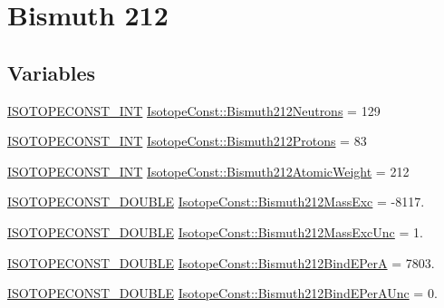 \hypertarget{group___isotope_const-_bismuth-_bi212}{}\section{Bismuth 212}
\label{group___isotope_const-_bismuth-_bi212}
\subsection*{Variables}
\begin{DoxyCompactItemize}
\item 
\mbox{\hyperlink{group___isotope_const-_macros_ga5f18360b3e99483a35c32d789e62621c}{I\+S\+O\+T\+O\+P\+E\+C\+O\+N\+S\+T\+\_\+\+I\+NT}} \mbox{\hyperlink{group___isotope_const-_bismuth-_bi212_gafde890acc72feb17eb33e141959ed41d}{Isotope\+Const\+::\+Bismuth212\+Neutrons}} = 129
\item 
\mbox{\hyperlink{group___isotope_const-_macros_ga5f18360b3e99483a35c32d789e62621c}{I\+S\+O\+T\+O\+P\+E\+C\+O\+N\+S\+T\+\_\+\+I\+NT}} \mbox{\hyperlink{group___isotope_const-_bismuth-_bi212_ga0f0a9d02760d8ba0804adef866d7d270}{Isotope\+Const\+::\+Bismuth212\+Protons}} = 83
\item 
\mbox{\hyperlink{group___isotope_const-_macros_ga5f18360b3e99483a35c32d789e62621c}{I\+S\+O\+T\+O\+P\+E\+C\+O\+N\+S\+T\+\_\+\+I\+NT}} \mbox{\hyperlink{group___isotope_const-_bismuth-_bi212_gaea2af2ef0f5ace70576ce96171aeb01d}{Isotope\+Const\+::\+Bismuth212\+Atomic\+Weight}} = 212
\item 
\mbox{\hyperlink{group___isotope_const-_macros_ga8f45a7272ce02c0b4c65c44636ed719a}{I\+S\+O\+T\+O\+P\+E\+C\+O\+N\+S\+T\+\_\+\+D\+O\+U\+B\+LE}} \mbox{\hyperlink{group___isotope_const-_bismuth-_bi212_ga6e482877de19ed5c54723f781240794a}{Isotope\+Const\+::\+Bismuth212\+Mass\+Exc}} = -\/8117.
\item 
\mbox{\hyperlink{group___isotope_const-_macros_ga8f45a7272ce02c0b4c65c44636ed719a}{I\+S\+O\+T\+O\+P\+E\+C\+O\+N\+S\+T\+\_\+\+D\+O\+U\+B\+LE}} \mbox{\hyperlink{group___isotope_const-_bismuth-_bi212_ga92706bf4ef668699746b2578fed9eeef}{Isotope\+Const\+::\+Bismuth212\+Mass\+Exc\+Unc}} = 1.
\item 
\mbox{\hyperlink{group___isotope_const-_macros_ga8f45a7272ce02c0b4c65c44636ed719a}{I\+S\+O\+T\+O\+P\+E\+C\+O\+N\+S\+T\+\_\+\+D\+O\+U\+B\+LE}} \mbox{\hyperlink{group___isotope_const-_bismuth-_bi212_gaae6f2850ee1f10d578de8e1a13b5b29d}{Isotope\+Const\+::\+Bismuth212\+Bind\+E\+PerA}} = 7803.
\item 
\mbox{\hyperlink{group___isotope_const-_macros_ga8f45a7272ce02c0b4c65c44636ed719a}{I\+S\+O\+T\+O\+P\+E\+C\+O\+N\+S\+T\+\_\+\+D\+O\+U\+B\+LE}} \mbox{\hyperlink{group___isotope_const-_bismuth-_bi212_ga55a9dc693d350c0e405293791ae94fd7}{Isotope\+Const\+::\+Bismuth212\+Bind\+E\+Per\+A\+Unc}} = 0.

\end{DoxyCompactItemize}
